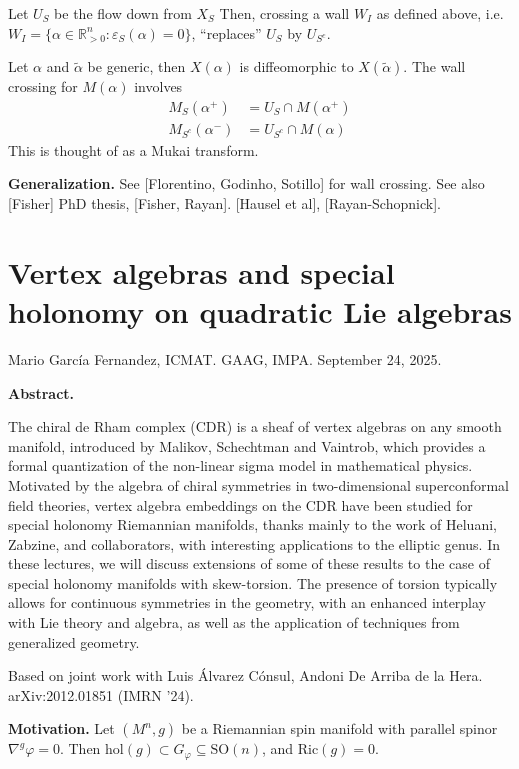 Let $U_S$ be the flow down from $X_S$
Then, crossing a wall  $W_I$ as defined above,
i.e. $W_I=\{\alpha \in \mathbb{R}^n_{>0}:\varepsilon_S(\alpha)=0\}$,
``replaces'' $U_S$ by $U_{S^c}$.

Let $\alpha$ and $\tilde{\alpha}$ be generic,
then $X(\alpha)$ is diffeomorphic to $X(\tilde{\alpha})$.
The wall crossing for $M(\alpha)$
involves
\begin{align*}
M_S(\alpha^+)&=U_S \cap M(\alpha^+)\\
M_{S^c}(\alpha^-)&=U_{S^c}\cap M(\alpha)
\end{align*}
This is thought of as a Mukai transform.

\medskip\noindent
{\bf Generalization.}
See [Florentino, Godinho, Sotillo] for wall crossing.
See also [Fisher] PhD thesis, [Fisher, Rayan].
[Hausel et al], [Rayan-Schopnick].

\section{Vertex algebras and special holonomy on quadratic Lie algebras}
\label{section-vertex-algebras-and-special-holonomy-on-quadratic-Lie-algebras}

\noindent
Mario García Fernandez, ICMAT.
GAAG, IMPA. 
September 24, 2025.

\medskip
{\bf Abstract.} 

The chiral de Rham complex (CDR) is a sheaf of vertex algebras on any smooth
manifold, introduced by Malikov, Schechtman and Vaintrob, which provides a
formal quantization of the non-linear sigma model in mathematical physics.
Motivated by the algebra of chiral symmetries in two-dimensional superconformal
field theories, vertex algebra embeddings on the CDR have been studied for
special holonomy Riemannian manifolds, thanks mainly to the work of Heluani,
Zabzine, and collaborators, with interesting applications to the elliptic genus.
In these lectures, we will discuss extensions of some of these results to the
case of special holonomy manifolds with skew-torsion. The presence of torsion
typically allows for continuous symmetries in the geometry, with an enhanced
interplay with Lie theory and algebra, as well as the application of techniques
from generalized geometry.


\medskip\noindent
Based on joint work with Luis Álvarez Cónsul,
Andoni De Arriba de la Hera. arXiv:2012.01851 (IMRN '24).

\medskip\noindent
{\bf Motivation.}
Let $(M^n,g)$ be a Riemannian spin manifold with
parallel spinor $\nabla^g \varphi=0$.
Then $\text{hol}(g) \subset G_\varphi \subseteq \text{SO}(n)$,
and $\text{Ric}(g)=0$.

